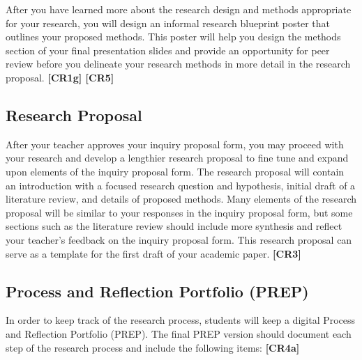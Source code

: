 \documentclass[11pt,]{article}
\begin{document}
After you have learned more about the research design and methods appropriate for your research, you will design an informal research blueprint poster that outlines your proposed methods. This poster will help you design the methods section of your final presentation slides and provide an opportunity for peer review before you delineate your research methods in more detail in the research proposal. \textbf{{[}CR1g{]} {[}CR5{]}}  

\hypertarget{research-proposal}{%
\subsection{Research Proposal}\label{research-proposal}}

After your teacher approves your inquiry proposal form, you may proceed with your research and develop a lengthier research proposal to fine tune and expand upon elements of the inquiry proposal form. The research proposal will contain an introduction with a focused research question and hypothesis, initial draft of a literature review, and details of proposed methods. Many elements of the research proposal will be similar to your responses in the inquiry proposal form, but some sections such as the literature review should include more synthesis and reflect your teacher's feedback on the inquiry proposal form. This research proposal can serve as a template for the first draft of your academic paper. \textbf{{[}CR3{]}} 

\hypertarget{process-and-reflection-portfolio-prep}{%
\subsection{Process and Reflection Portfolio (PREP)}\label{process-and-reflection-portfolio-prep}}

In order to keep track of the research process, students will keep a digital Process and Reflection Portfolio (PREP). The final PREP version should document each step of the research process and include the following items: \textbf{{[}CR4a{]}} 
\end{document}
